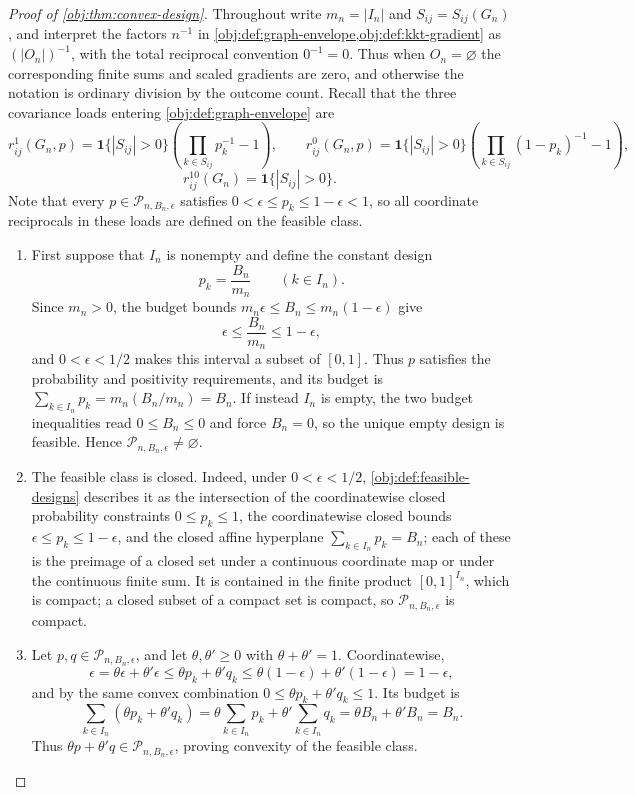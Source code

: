 \documentclass[11pt]{article}
\begin{document}
\begin{proof}[Proof of \cref{obj:thm:convex-design}]
Throughout write \(m_n=|I_n|\) and \(S_{ij}=S_{ij}(G_n)\), and interpret the factors \(n^{-1}\) in \cref{obj:def:graph-envelope,obj:def:kkt-gradient} as \((|O_n|)^{-1}\), with the total reciprocal convention \(0^{-1}=0\).  Thus when \(O_n=\varnothing\) the corresponding finite sums and scaled gradients are zero, and otherwise the notation is ordinary division by the outcome count.  Recall that the three covariance loads entering \cref{obj:def:graph-envelope} are
\[
r_{ij}^1(G_n,p)
=\mathbf 1\{|S_{ij}|>0\}\left(\prod_{k\in S_{ij}}p_k^{-1}-1\right),
\qquad
r_{ij}^0(G_n,p)
=\mathbf 1\{|S_{ij}|>0\}\left(\prod_{k\in S_{ij}}(1-p_k)^{-1}-1\right),
\]
\[
r_{ij}^{10}(G_n)=\mathbf 1\{|S_{ij}|>0\}.
\]
Note that every \(p\in\mathcal P_{n,B_n,\epsilon}\) satisfies \(0<\epsilon\le p_k\le1-\epsilon<1\), so all coordinate reciprocals in these loads are defined on the feasible class.

\begin{enumerate}
\item First suppose that \(I_n\) is nonempty and define the constant design
\[
p_k=\frac{B_n}{m_n}\qquad(k\in I_n).
\]
Since \(m_n>0\), the budget bounds \(m_n\epsilon\le B_n\le m_n(1-\epsilon)\) give
\[
\epsilon\le \frac{B_n}{m_n}\le 1-\epsilon,
\]
and \(0<\epsilon<1/2\) makes this interval a subset of \([0,1]\).  Thus \(p\) satisfies the probability and positivity requirements, and its budget is \(\sum_{k\in I_n}p_k=m_n(B_n/m_n)=B_n\).  If instead \(I_n\) is empty, the two budget inequalities read \(0\le B_n\le0\) and force \(B_n=0\), so the unique empty design is feasible.  Hence \(\mathcal P_{n,B_n,\epsilon}\neq\varnothing\).

\item The feasible class is closed.  Indeed, under \(0<\epsilon<1/2\), \cref{obj:def:feasible-designs} describes it as the intersection of the coordinatewise closed probability constraints \(0\le p_k\le1\), the coordinatewise closed bounds \(\epsilon\le p_k\le1-\epsilon\), and the closed affine hyperplane \(\sum_{k\in I_n}p_k=B_n\); each of these is the preimage of a closed set under a continuous coordinate map or under the continuous finite sum.  It is contained in the finite product \([0,1]^{I_n}\), which is compact; a closed subset of a compact set is compact, so \(\mathcal P_{n,B_n,\epsilon}\) is compact.

\item Let \(p,q\in\mathcal P_{n,B_n,\epsilon}\), and let \(\theta,\theta'\ge0\) with \(\theta+\theta'=1\).  Coordinatewise,
\[
\epsilon=\theta\epsilon+\theta'\epsilon
 \le \theta p_k+\theta'q_k
 \le \theta(1-\epsilon)+\theta'(1-\epsilon)=1-\epsilon,
\]
and by the same convex combination \(0\le \theta p_k+\theta'q_k\le1\).  Its budget is
\[
\sum_{k\in I_n}(\theta p_k+\theta'q_k)
 =\theta\sum_{k\in I_n}p_k+\theta'\sum_{k\in I_n}q_k
 =\theta B_n+\theta'B_n=B_n.
\]
Thus \(\theta p+\theta'q\in\mathcal P_{n,B_n,\epsilon}\), proving convexity of the feasible class.


\end{enumerate}
\end{proof}
\end{document}
